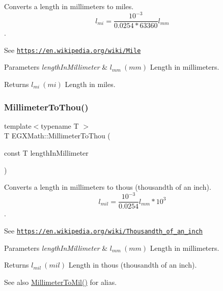 Converts a length in millimeters to miles. \[ l_{mi}=\frac{10^{-3}}{0.0254 * 63360} l_{mm} \]. 

See \href{https://en.wikipedia.org/wiki/Mile}{\tt https\+://en.\+wikipedia.\+org/wiki/\+Mile} 
\begin{DoxyParams}{Parameters}
{\em length\+In\+Millimeter} & $ l_{mm}\ (mm)$ Length in millimeters. \\
\hline
\end{DoxyParams}
\begin{DoxyReturn}{Returns}
$ l_{mi}\ (mi)$ Length in miles. 
\end{DoxyReturn}
\mbox{\label{group___e_g_x_math-_conversions-_length_conversions-_millimeter-_imperial_ga099bde3b0f85fbbfbe91f0162a392835}} 
\subsubsection{\texorpdfstring{Millimeter\+To\+Thou()}{MillimeterToThou()}}
{\footnotesize\ttfamily template$<$typename T $>$ \\
T E\+G\+X\+Math\+::\+Millimeter\+To\+Thou (\begin{DoxyParamCaption}\item[{const T}]{length\+In\+Millimeter }\end{DoxyParamCaption})}



Converts a length in millimeters to thous (thousandth of an inch). \[ l_{mil}= \frac{10^{-3}}{0.0254} l_{mm} * 10^{3} \]. 

See \href{https://en.wikipedia.org/wiki/Thousandth_of_an_inch}{\tt https\+://en.\+wikipedia.\+org/wiki/\+Thousandth\+\_\+of\+\_\+an\+\_\+inch} 
\begin{DoxyParams}{Parameters}
{\em length\+In\+Millimeter} & $ l_{mm}\ (mm)$ Length in millimeters. \\
\hline
\end{DoxyParams}
\begin{DoxyReturn}{Returns}
$ l_{mil}\ (mil)$ Length in thous (thousandth of an inch). 
\end{DoxyReturn}
\begin{DoxySeeAlso}{See also}
\mbox{\hyperlink{group___e_g_x_math-_conversions-_length_conversions-_millimeter-_imperial_gaf811317f4ce575df4ff0329491e92fac}{Millimeter\+To\+Mil()}} for alias. 
\end{DoxySeeAlso}
\mbox{\label{group___e_g_x_math-_conversions-_length_conversions-_millimeter-_imperial_gae1b144c2bc56f6591e0ee9b37f0653fa}} 
